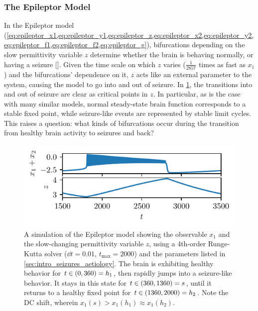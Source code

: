 \subsubsection{The Epileptor Model}
\label{sec:lit_review_bifurcation_epileptor}
In the Epileptor model (\cref{eq:epileptor_x1,eq:epileptor_y1,eq:epileptor_z,eq:epileptor_x2,eq:epileptor_y2,eq:epileptor_f1,eq:epileptor_f2,eq:epileptor_g}), bifurcations depending on the slow permittivity variable $z$ determine whether the brain is behaving normally, or having a seizure [].
Given the time scale on which $z$ varies ($\frac{1}{2857}$ times as fast as $x_{1}$) and the bifurcations' dependence on it, $z$ acts like an external parameter to the system, causing the model to go into and out of seizure.
In \cref{fig:epileptor}, the transitions into and out of seizure are clear as critical points in $z$.
In particular, as is the case with many similar models, normal steady-state brain function corresponds to a stable fixed point, while seizure-like events are represented by stable limit cycles.
This raises a question: what kinds of bifurcations occur during the transition from healthy brain activity to seizures and back?
\begin{figure}[ht]
  \centering
  \includegraphics[width=\columnwidth]{figure/epileptor.pdf}
  \caption[Epileptor simulation]{A simulation of the Epileptor model showing the observable $x_{1}$ and the slow-changing permittivity variable $z$, using a 4th-order Runge-Kutta solver ($\dd{t} = 0.01$, $t_{\text{max}} = 2000$) and the parameters listed in \cref{sec:intro_seizures_aetiology}.
    The brain is exhibiting healthy behavior for $t \in \pqty{0, 360} = h_{1}$, then rapidly jumps into a seizure-like behavior.
    It stays in this state for $t \in \pqty{360, 1360} = s$, until it returns to a healthy fixed point for $t \in \pqty{1360, 2000} = h_{2}$.
    Note the DC shift, wherein $x_{1}(s) > x_{1}(h_{1}) \approx x_{1}(h_{2})$.
  }
  \label{fig:epileptor}
\end{figure}

